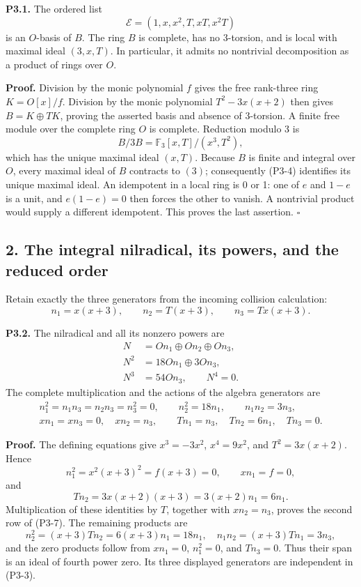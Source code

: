 \documentclass[
]{article}
\begin{document}
\textbf{P3.1.} The ordered list \[
\mathcal E=(1,x,x^2,T,xT,x^2T)
\tag{P3-3}
\] is an \(O\)-basis of \(B\). The ring \(B\) is complete, has no
3-torsion, and is local with maximal ideal \((3,x,T)\). In particular,
it admits no nontrivial decomposition as a product of rings over \(O\).

\textbf{Proof.} Division by the monic polynomial \(f\) gives the free
rank-three ring \(K=O[x]/f\). Division by the monic polynomial
\(T^2-3x(x+2)\) then gives \(B=K\oplus TK\), proving the asserted basis
and absence of 3-torsion. A finite free module over the complete ring
\(O\) is complete. Reduction modulo 3 is \[
B/3B=\mathbb F_3[x,T]/(x^3,T^2),
\tag{P3-4}
\] which has the unique maximal ideal \((x,T)\). Because \(B\) is finite
and integral over \(O\), every maximal ideal of \(B\) contracts to
\((3)\); consequently (P3-4) identifies its unique maximal ideal. An
idempotent in a local ring is 0 or 1: one of \(e\) and \(1-e\) is a
unit, and \(e(1-e)=0\) then forces the other to vanish. A nontrivial
product would supply a different idempotent. This proves the last
assertion. \(\square\)

\subsection{2. The integral nilradical, its powers, and the reduced
order}\label{the-integral-nilradical-its-powers-and-the-reduced-order}

Retain exactly the three generators from the incoming collision
calculation: \[
n_1=x(x+3),\qquad n_2=T(x+3),\qquad n_3=Tx(x+3).
\tag{P3-5}
\]

\textbf{P3.2.} The nilradical and all its nonzero powers are \[
\begin{aligned}
N&=On_1\oplus On_2\oplus On_3,\\
N^2&=18On_1\oplus3On_3,\\
N^3&=54On_3,\qquad N^4=0.
\end{aligned}
\tag{P3-6}
\] The complete multiplication and the actions of the algebra generators
are \[
\begin{gathered}
n_1^2=n_1n_3=n_2n_3=n_3^2=0,\qquad
n_2^2=18n_1,\qquad n_1n_2=3n_3,\\
xn_1=xn_3=0,\quad xn_2=n_3,\qquad
Tn_1=n_3,\quad Tn_2=6n_1,\quad Tn_3=0.
\end{gathered}
\tag{P3-7}
\]

\textbf{Proof.} The defining equations give \(x^3=-3x^2\), \(x^4=9x^2\),
and \(T^2=3x(x+2)\). Hence \[
n_1^2=x^2(x+3)^2=f(x+3)=0,\qquad
xn_1=f=0,
\] and \[
Tn_2=3x(x+2)(x+3)=3(x+2)n_1=6n_1.
\] Multiplication of these identities by \(T\), together with
\(xn_2=n_3\), proves the second row of (P3-7). The remaining products
are \[
n_2^2=(x+3)Tn_2=6(x+3)n_1=18n_1,
\quad n_1n_2=(x+3)Tn_1=3n_3,
\] and the zero products follow from \(xn_1=0\), \(n_1^2=0\), and
\(Tn_3=0\). Thus their span is an ideal of fourth power zero. Its three
displayed generators are independent in (P3-3).
\end{document}
